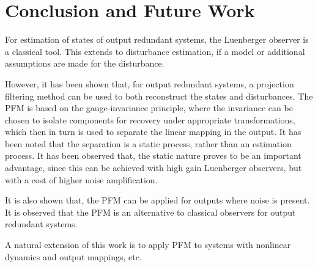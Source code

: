 \section{Conclusion and Future Work}




For estimation of states of output redundant systems, the Luenberger observer is a classical tool. This extends to disturbance estimation, if a model or additional assumptions are made for the disturbance. 

However, it has been shown that, for output redundant systems, a projection filtering method can be used to both reconstruct the states and disturbances. The PFM is based on the gauge-invariance principle, where the invariance can be chosen to isolate components for recovery under appropriate transformations, which then in turn is used to separate the linear mapping in the output. It has been noted that the separation is a static process, rather than an estimation process. It has been observed that, the static nature proves to be an important advantage, since this can be achieved with high gain Luenberger observers, but with a cost of higher noise amplification. 

It is also shown that, the PFM can be applied for outputs where noise is present. It is observed that the PFM is an alternative to classical observers for output redundant systems.

A natural extension of this work is to apply PFM to systems with nonlinear dynamics and output mappings, etc. 

